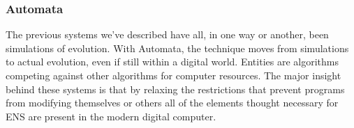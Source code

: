 %
%
%
%
%
%
%
%
%
%
\subsubsection{Automata}
The previous systems we've described have all, in one way or another, been simulations of evolution. With Automata, the technique moves from simulations to actual evolution, even if still within a digital world. Entities are algorithms competing against other algorithms for computer resources. The major insight behind these systems is that by relaxing the restrictions that prevent programs from modifying themselves or others all of the elements thought necessary for \gls{ENS} are present in the modern digital computer.


